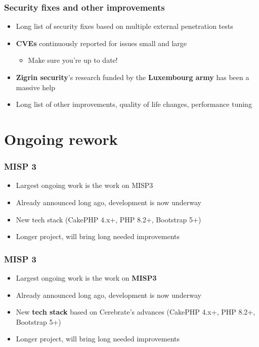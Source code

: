 \begin{frame}
  \frametitle{Security fixes and other improvements}
  \begin{itemize}
     \item Long list of security fixes based on multiple external penetration tests
     \item {\bf CVEs} continuously reported for issues small and large
     \begin{itemize}
         \item Make sure you're up to date!
     \end{itemize}
     \item {\bf Zigrin security}'s research funded by the {\bf Luxembourg army} has been a massive help
     \item Long list of other improvements, quality of life changes, performance tuning
  \end{itemize}
\end{frame}

\section{Ongoing rework}

\begin{frame}
  \frametitle{MISP 3}
  \begin{itemize}
     \item Largest ongoing work is the work on MISP3
     \item Already announced long ago, development is now underway
     \item New tech stack (CakePHP 4.x+, PHP 8.2+, Bootstrap 5+)
     \item Longer project, will bring long needed improvements
  \end{itemize}
\end{frame}

\begin{frame}
  \frametitle{MISP 3}
  \begin{itemize}
     \item Largest ongoing work is the work on {\bf MISP3}
     \item Already announced long ago, development is now underway
     \item New {\bf tech stack} based on Cerebrate's advances (CakePHP 4.x+, PHP 8.2+, Bootstrap 5+)
     \item Longer project, will bring long needed improvements
  \end{itemize}
\end{frame}

